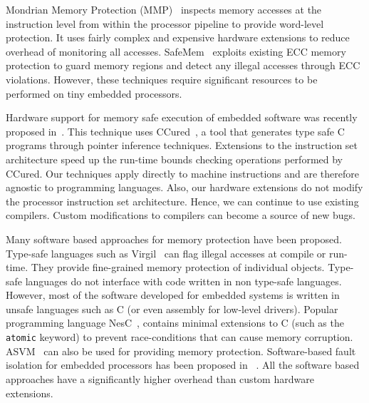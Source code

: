 %
Mondrian Memory Protection (MMP)~\cite{witchel-asplos02-mondrian} inspects memory accesses at the instruction level from within the processor pipeline to provide word-level protection.
%
It uses fairly complex and expensive hardware extensions to reduce overhead of monitoring all accesses.
%
SafeMem~\cite{qin-hpca05-safemem} exploits existing ECC memory protection to guard memory regions and detect any illegal accesses through ECC violations.
%
However, these techniques require significant resources to be performed on tiny embedded processors.

%
Hardware support for memory safe execution of embedded software was recently proposed in~\cite{divya06ccured}.
%
This technique uses CCured~\cite{ccured02necula}, a tool that generates type safe C programs through pointer inference techniques.
%
Extensions to the instruction set architecture speed up the run-time bounds checking operations performed by CCured.
%
Our techniques apply directly to machine instructions and are therefore agnostic to programming languages.
%
Also, our hardware extensions do not modify the processor instruction set architecture.
%
Hence, we can continue to use existing compilers.
%
Custom modifications to compilers can become a source of new bugs.
%

Many software based approaches for memory protection have been proposed.
%
Type-safe languages such as Virgil~\cite{titzer06virgil} can flag illegal accesses at compile or run-time.
%
They provide fine-grained memory protection of individual objects.
%
Type-safe languages do not interface with code written in non type-safe languages.
%
However, most of the software developed for embedded systems is written in unsafe languages such as C (or even assembly for low-level drivers). 
%
Popular programming language NesC~\cite{gay03nesc}, contains minimal extensions to C (such as the \texttt{atomic} keyword) to prevent race-conditions that can cause memory corruption.
%
ASVM~\cite{asvm05nsdi} can also be used for providing memory protection. 
%
Software-based fault isolation for embedded processors has been proposed in ~\cite{ram07harbor}.
%
All the software based approaches have a significantly higher overhead than custom hardware extensions.
